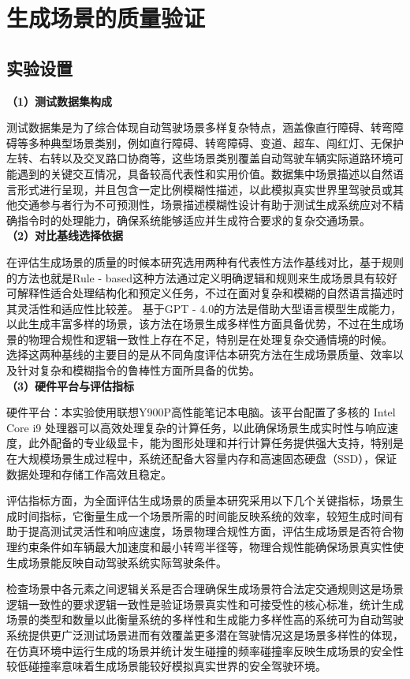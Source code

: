 \chapter{生成场景的质量验证}
\section{实验设置}
\textbf{（1）测试数据集构成} \par
测试数据集是为了综合体现自动驾驶场景多样复杂特点，涵盖像直行障碍、转弯障碍等多种典型场景类别，例如直行障碍、转弯障碍、变道、超车、闯红灯、无保护左转、右转以及交叉路口协商等，这些场景类别覆盖自动驾驶车辆实际道路环境可能遇到的关键交互情况，具备较高代表性和实用价值。数据集中场景描述以自然语言形式进行呈现，并且包含一定比例模糊性描述，以此模拟真实世界里驾驶员或其他交通参与者行为不可预测性，场景描述模糊性设计有助于测试生成系统应对不精确指令时的处理能力，确保系统能够适应并生成符合要求的复杂交通场景。\\
\indent\textbf{（2）对比基线选择依据} \par
在评估生成场景的质量的时候本研究选用两种有代表性方法作基线对比，基于规则的方法也就是Rule - based这种方法通过定义明确逻辑和规则来生成场景具有较好可解释性适合处理结构化和预定义任务，不过在面对复杂和模糊的自然语言描述时其灵活性和适应性比较差。
基于GPT - 4.0的方法是借助大型语言模型生成能力，以此生成丰富多样的场景，该方法在场景生成多样性方面具备优势，不过在生成场景的物理合规性和逻辑一致性上存在不足，特别是在处理复杂交通情境的时候。
选择这两种基线的主要目的是从不同角度评估本研究方法在生成场景质量、效率以及针对复杂和模糊指令的鲁棒性方面所具备的优势。\\
\indent\textbf{（3）硬件平台与评估指标} \par
硬件平台：本实验使用联想Y900P高性能笔记本电脑。该平台配置了多核的 Intel Core i9 处理器可以高效处理复杂的计算任务，以此确保场景生成实时性与响应速度，此外配备的专业级显卡，能为图形处理和并行计算任务提供强大支持，特别是在大规模场景生成过程中，系统还配备大容量内存和高速固态硬盘（SSD），保证数据处理和存储工作高效且稳定。

评估指标方面，为全面评估生成场景的质量本研究采用以下几个关键指标，场景生成时间指标，它衡量生成一个场景所需的时间能反映系统的效率，较短生成时间有助于提高测试灵活性和响应速度，场景物理合规性方面，评估生成场景是否符合物理约束条件如车辆最大加速度和最小转弯半径等，物理合规性能确保场景真实性使生成场景能反映自动驾驶系统实际驾驶条件。


检查场景中各元素之间逻辑关系是否合理确保生成场景符合法定交通规则这是场景逻辑一致性的要求逻辑一致性是验证场景真实性和可接受性的核心标准，统计生成场景的类型和数量以此衡量系统的多样性和生成能力多样性高的系统可为自动驾驶系统提供更广泛测试场景进而有效覆盖更多潜在驾驶情况这是场景多样性的体现，在仿真环境中运行生成的场景并统计发生碰撞的频率碰撞率反映生成场景的安全性较低碰撞率意味着生成场景能较好模拟真实世界的安全驾驶环境。





